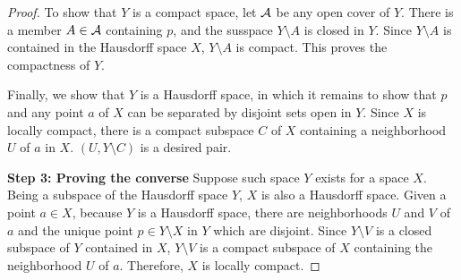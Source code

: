 \begin{proof}
    To show that $Y$ is a compact space, let ${\mathcal{A}}$ be any open cover of $Y$.
    There is a member $A\in{\mathcal{A}}$ containing $p$, and the susspace $Y\setminus A$ is closed in $Y$.
    Since $Y\setminus A$ is contained in the Hausdorff space $X$, $Y\setminus A$ is compact.
    This proves the compactness of $Y$.

    Finally, we show that $Y$ is a Hausdorff space, in which it remains to show that $p$ and any point $a$ of $X$ can be separated by disjoint sets open in $Y$.
    Since $X$ is locally compact, there is a compact subspace $C$ of $X$ containing a neighborhood $U$ of $a$ in $X$.
    $(U, Y\setminus C)$ is a desired pair.

    \textbf{Step 3: Proving the converse}\newline\indent
    Suppose such space $Y$ exists for a space $X$.
    Being a subspace of the Hausdorff space $Y$, $X$ is also a Hausdorff space.
    Given a point $a\in X$, because $Y$ is a Hausdorff space, there are neighborhoods $U$ and $V$ of $a$ and the unique point $p\in Y\setminus X$ in $Y$ which are disjoint.
    Since $Y\setminus V$ is a closed subspace of $Y$ contained in $X$, $Y\setminus V$ is a compact subspace of $X$ containing the neighborhood $U$ of $a$.
    Therefore, $X$ is locally compact.
\end{proof}

